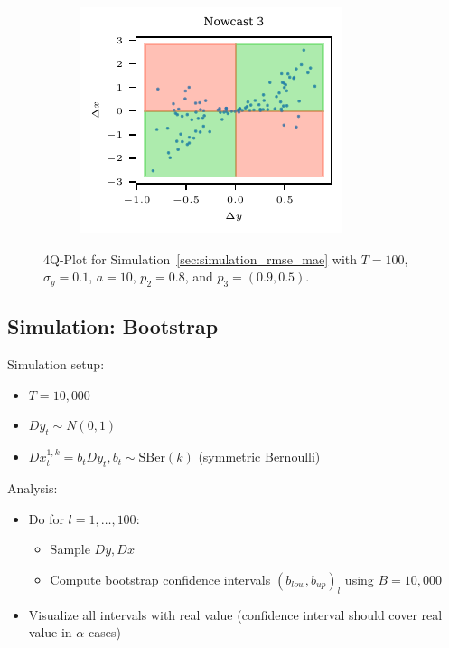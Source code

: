 \documentclass[oneside]{article}
\theoremstyle{plain}%
\theoremstyle{definition}
\newcommand{\ydiff}{D y}
\newcommand{\xdiff}{Dx}
\newcommand{\SBer}{\text{SBer}}
\begin{document}
\begin{figure}
\begin{subfigure}{.32\textwidth}
  	\includegraphics{plots/simulation_same_rmse_mae/4q_plot_3}
  \end{subfigure}
  \caption{4Q-Plot for Simulation~\ref{sec:simulation_rmse_mae} with $T = 100$, $\sigma_y=0.1$, $a = 10$, $p_2 = 0.8$, and $p_3 = (0.9, 0.5)$.}
  \label{fig:simulation_rmse_mae_4q}
\end{figure}

\subsection{Simulation: Bootstrap}

Simulation setup:

\begin{itemize}
  \item $T = 10,000$
  \item $\ydiff_t \sim N(0, 1)$ 
  \item $\xdiff_t^{1, k} = b_t  \ydiff_t, b_t \sim \SBer(k)$ (symmetric Bernoulli)
\end{itemize}

Analysis:
\begin{itemize}
\item Do for $l = 1, \dots, 100$:
\begin{itemize}
  \item Sample $\ydiff, \xdiff$
  \item Compute bootstrap confidence intervals $(b_{low}, b_{up})_l$ using $B = 10,000$
\end{itemize}
  \item Visualize all intervals with real value (confidence interval should cover real value in $\alpha$ cases)
\end{itemize}
\end{document}
